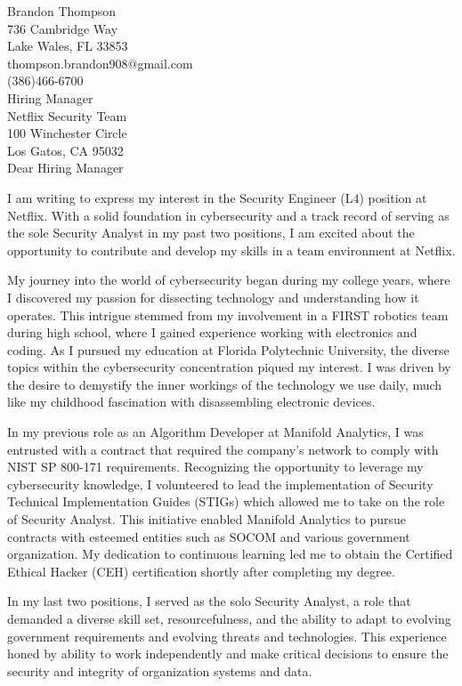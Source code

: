 \documentclass{resume} %
\newcommand\company{Netflix}
\newcommand\position{Security Engineer (L4)}
\newcommand\location{Chicago, Illinois}
\begin{document}
Brandon Thompson\\
736 Cambridge Way\\
Lake Wales, FL 33853\\
thompson.brandon908@gmail.com\\
(386)466-6700\\


Hiring Manager\\
\company{} Security Team\\
100 Winchester Circle\\
Los Gatos, CA 95032\\

Dear Hiring Manager

I am writing to express my interest in the \position{} position at \company{}.
With a solid foundation in cybersecurity and a track record of serving as the sole Security Analyst in my past two positions, I am excited about the opportunity to contribute and develop my skills in a team environment at \company{}.

My journey into the world of cybersecurity began during my college years, where I discovered my passion for dissecting technology and understanding how it operates.
This intrigue stemmed from my involvement in a FIRST robotics team during high school, where I gained experience working with electronics and coding.
As I pursued my education at Florida Polytechnic University, the diverse topics within the cybersecurity concentration piqued my interest.
I was driven by the desire to demystify the inner workings of the technology we use daily, much like my childhood fascination with disassembling electronic devices.

In my previous role as an Algorithm Developer at Manifold Analytics, I was entrusted with a contract that required the company's network to comply with NIST SP 800-171 requirements.
Recognizing the opportunity to leverage my cybersecurity knowledge, I volunteered to lead the implementation of Security Technical Implementation Guides (STIGs) which allowed me to take on the role of Security Analyst.
This initiative enabled Manifold Analytics to pursue contracts with esteemed entities such as SOCOM and various government organization.
My dedication to continuous learning led me to obtain the Certified Ethical Hacker (CEH) certification shortly after completing my degree.

In my last two positions, I served as the solo Security Analyst, a role that demanded a diverse skill set, resourcefulness, and the ability to adapt to evolving government requirements and evolving threats and technologies.
This experience honed by ability to work independently and make critical decisions to ensure the security and integrity of organization systems and data.
\end{document}

